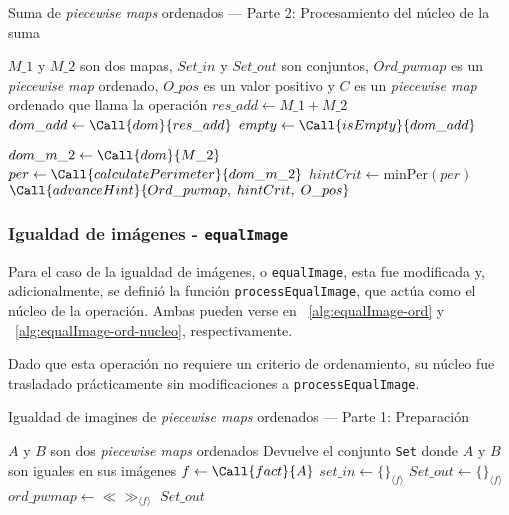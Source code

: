 \begin{algorithm}
\caption{Suma de \textit{piecewise maps} ordenados — Parte 2: Procesamiento del núcleo de la suma}
\label{alg:suma-ord-nucleo}
\begin{algorithmic}[1]
\Require $M\_1$ y $M\_2$ son dos mapas, $Set\_in$ y $Set\_out$ son conjuntos, $Ord\_pwmap$ es un \textit{piecewise map} ordenado, $O\_pos$ es un valor positivo y $C$ es un \textit{piecewise map} ordenado que llama la operación
    \State $res\_add \gets M\_1 + M\_2$
    \State $dom\_add \gets \Call{dom}{res\_add}$
    \State $empty \gets \Call{isEmpty}{dom\_add}$

        \State $dom\_m\_2 \gets \Call{dom}{M\_2}$
        \State $per \gets \Call{calculatePerimeter}{dom\_m\_2}$
        \State $hintCrit \gets \mathrm{minPer}(per)$
        \State $\Call{advanceHint}{Ord\_pwmap,\;hintCrit,\;O\_pos}$
        \State {}
    \EndIf
    \State \Return
\EndFunction
\end{algorithmic}
\end{algorithm}

\subsubsection{Igualdad de imágenes - \texttt{equalImage}}

Para el caso de la igualdad de imágenes, o \texttt{equalImage}, esta fue modificada y, adicionalmente, se definió la función \texttt{processEqualImage}, que actúa como el núcleo de la operación. Ambas pueden verse en ~\ref{alg:equalImage-ord} y ~\ref{alg:equalImage-ord-nucleo}, respectivamente.

Dado que esta operación no requiere un criterio de ordenamiento, su núcleo fue trasladado prácticamente sin modificaciones a \texttt{processEqualImage}.

\begin{algorithm}
\caption{Igualdad de imagines de \textit{piecewise maps} ordenados — Parte 1: Preparación}
\label{alg:equalImage-ord}
\begin{algorithmic}[1]
\Require $A$ y $B$ son dos \textit{piecewise maps} ordenados
\Ensure Devuelve el conjunto \texttt{Set} donde $A$ y $B$ son iguales en sus imágenes
    \State $f \gets \Call{fact}{A}$
    \State $set\_in \gets \{\}_{\langle f \rangle}$
    \State $Set\_out \gets \{\}_{\langle f \rangle}$
    \State $ord\_pwmap \gets \ll\gg_{\langle f \rangle}$
    \State {}
    \State \Return $Set\_out$
\EndFunction
\end{algorithmic}
\end{algorithm}

